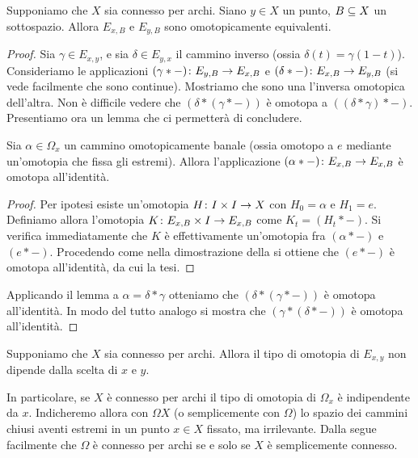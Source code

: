 \begin{proposition}
Supponiamo che $X$ sia connesso per archi. Siano $y\in X$ un punto, $B\subseteq X$ un sottospazio. Allora $E_{x,B}$ e $E_{y,B}$ sono omotopicamente equivalenti.
\end{proposition}
\begin{proof}
Sia $\gamma\in E_{x,y}$, e sia $\delta\in E_{y,x}$ il cammino inverso (ossia $\delta(t)=\gamma(1-t)$). Consideriamo le applicazioni $\map{(\gamma\ast-)}{E_{y,B}}{E_{x,B}}$ e $\map{(\delta\ast-)}{E_{x,B}}{E_{y,B}}$ (si vede facilmente che sono continue). Mostriamo che sono una l'inversa omotopica dell'altra. Non è difficile vedere che $(\delta\ast(\gamma\ast-))$ è omotopa a $((\delta\ast\gamma)\ast-)$. Presentiamo ora un lemma che ci permetterà di concludere.
\begin{lemma}
Sia $\alpha\in\Omega_x$ un cammino omotopicamente banale (ossia omotopo a $e$ mediante un'omotopia che fissa gli estremi). Allora l'applicazione $\map{(\alpha\ast-)}{E_{x,B}}{E_{x,B}}$ è omotopa all'identità.
\end{lemma}
\begin{proof}
Per ipotesi esiste un'omotopia $\map{H}{I\times I}{X}$ con $H_0=\alpha$ e $H_1=e$. Definiamo allora l'omotopia $\map{K}{E_{x,B}\times I}{E_{x,B}}$ come $K_t=(H_t\ast-)$. Si verifica immediatamente che $K$ è effettivamente un'omotopia fra $(\alpha\ast-)$ e $(e\ast-)$. Procedendo come nella dimostrazione della  si ottiene che $(e\ast-)$ è omotopa all'identità, da cui la tesi.
\end{proof}
Applicando il lemma a $\alpha=\delta\ast\gamma$ otteniamo che $(\delta\ast(\gamma\ast-))$ è omotopa all'identità. In modo del tutto analogo si mostra che $(\gamma\ast(\delta\ast-))$ è omotopa all'identità.
\end{proof}
\begin{corollary}
Supponiamo che $X$ sia connesso per archi. Allora il tipo di omotopia di $E_{x,y}$ non dipende dalla scelta di $x$ e $y$.
\end{corollary}
In particolare, se $X$ è connesso per archi il tipo di omotopia di $\Omega_x$ è indipendente da $x$. Indicheremo allora con $\Omega X$ (o semplicemente con $\Omega$) lo spazio dei cammini chiusi aventi estremi in un punto $x\in X$ fissato, ma irrilevante. Dalla  segue facilmente che $\Omega$ è connesso per archi se e solo se $X$ è semplicemente connesso.

